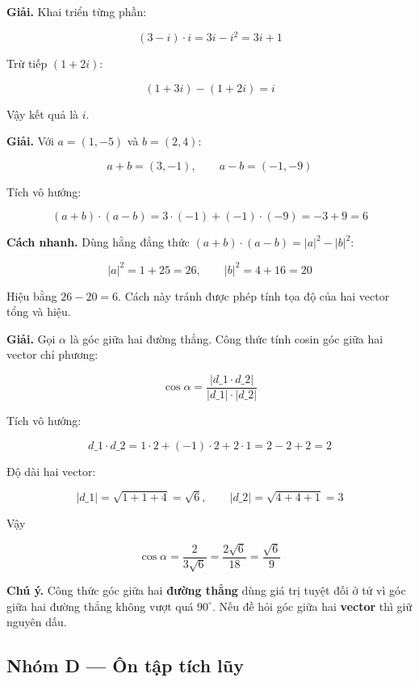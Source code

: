 \documentclass[11pt, a4paper]{article}
\begin{document}
\begin{dapan}[21 — Đáp án C]
\textbf{Giải.} Khai triển từng phần:

$$(3 - i) \cdot i = 3i - i^2 = 3i + 1$$

Trừ tiếp $(1 + 2i)$:

$$(1 + 3i) - (1 + 2i) = i$$

Vậy kết quả là $i$.
\end{dapan}

\begin{dapan}[22 — Đáp án D]
\textbf{Giải.} Với $a = (1, -5)$ và $b = (2, 4)$:

$$a + b = (3, -1), \qquad a - b = (-1, -9)$$

Tích vô hướng:

$$(a+b) \cdot (a-b) = 3 \cdot (-1) + (-1) \cdot (-9) = -3 + 9 = 6$$

\textbf{Cách nhanh.} Dùng hằng đẳng thức $(a+b) \cdot (a-b) = \lvert a \rvert^2 - \lvert b \rvert^2$:

$$\lvert a \rvert^2 = 1 + 25 = 26, \qquad \lvert b \rvert^2 = 4 + 16 = 20$$

Hiệu bằng $26 - 20 = 6$. Cách này tránh được phép tính tọa độ của hai vector tổng và hiệu.
\end{dapan}

\begin{dapan}[23 — Đáp án D]
\textbf{Giải.} Gọi $\alpha$ là góc giữa hai đường thẳng. Công thức tính cosin góc giữa hai vector chỉ phương:

$$\cos\alpha = \frac{\lvert d\_1 \cdot d\_2 \rvert}{\lvert d\_1 \rvert \cdot \lvert d\_2 \rvert}$$

Tích vô hướng:

$$d\_1 \cdot d\_2 = 1 \cdot 2 + (-1) \cdot 2 + 2 \cdot 1 = 2 - 2 + 2 = 2$$

Độ dài hai vector:

$$\lvert d\_1 \rvert = \sqrt{1 + 1 + 4} = \sqrt{6}, \qquad \lvert d\_2 \rvert = \sqrt{4 + 4 + 1} = 3$$

Vậy

$$\cos\alpha = \frac{2}{3\sqrt{6}} = \frac{2\sqrt{6}}{18} = \frac{\sqrt{6}}{9}$$

\textbf{Chú ý.} Công thức góc giữa hai \textbf{đường thẳng} dùng giá trị tuyệt đối ở tử vì góc giữa hai đường thẳng không vượt quá $90^\circ$. Nếu đề hỏi góc giữa hai \textbf{vector} thì giữ nguyên dấu.
\end{dapan}

\subsection*{Nhóm D — Ôn tập tích lũy}
\end{document}
